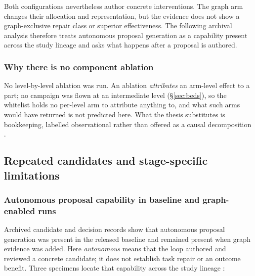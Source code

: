Both configurations nevertheless author concrete interventions. The graph
arm changes their allocation and representation, but the evidence does not
show a graph-exclusive repair class or superior effectiveness. The following
archival analysis therefore treats autonomous proposal generation as a
capability present across the study lineage and asks what happens after a
proposal is authored.

\subsubsection*{Why there is no component ablation}

No level-by-level ablation was run. An ablation \emph{attributes} an
arm-level effect to a part; no campaign was flown at an intermediate
level (\S\ref{sec:beds}), so the whitelist holds no per-level arm to
attribute anything to, and what such arms would have returned is not
predicted here. What the
thesis substitutes is bookkeeping, labelled  observational rather
than offered as a causal decomposition . 

\subsection{Repeated candidates and stage-specific limitations}
\label{sec:archaeology}

\subsubsection*{Autonomous proposal capability in baseline and graph-enabled runs}

Archived candidate and decision records show that autonomous proposal
generation was present in the released baseline and remained present when
graph evidence was added. Here \emph{autonomous} means that the loop authored
and reviewed a concrete candidate; it does not establish task repair or an
outcome benefit. Three specimens locate that capability across the study
lineage :

